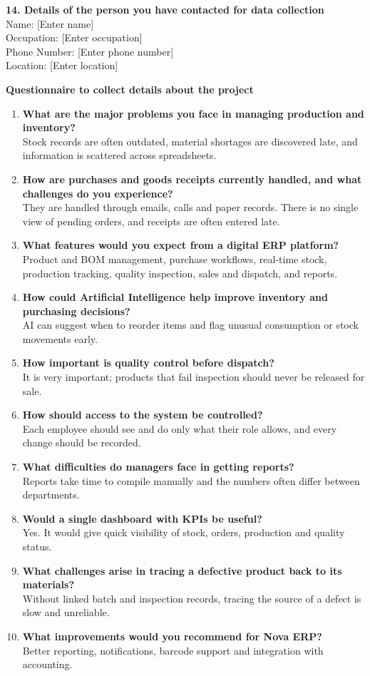 \documentclass[12pt,a4paper]{report}
\begin{document}
\textbf{14. Details of the person you have contacted for data collection}\\
Name: [Enter name]\\
Occupation: [Enter occupation]\\
Phone Number: [Enter phone number]\\
Location: [Enter location]

\textbf{Questionnaire to collect details about the project}
\begin{enumerate}
\item \textbf{What are the major problems you face in managing production and inventory?}\\
Stock records are often outdated, material shortages are discovered late, and information is scattered across spreadsheets.
\item \textbf{How are purchases and goods receipts currently handled, and what challenges do you experience?}\\
They are handled through emails, calls and paper records. There is no single view of pending orders, and receipts are often entered late.
\item \textbf{What features would you expect from a digital ERP platform?}\\
Product and BOM management, purchase workflows, real-time stock, production tracking, quality inspection, sales and dispatch, and reports.
\item \textbf{How could Artificial Intelligence help improve inventory and purchasing decisions?}\\
AI can suggest when to reorder items and flag unusual consumption or stock movements early.
\item \textbf{How important is quality control before dispatch?}\\
It is very important; products that fail inspection should never be released for sale.
\item \textbf{How should access to the system be controlled?}\\
Each employee should see and do only what their role allows, and every change should be recorded.
\item \textbf{What difficulties do managers face in getting reports?}\\
Reports take time to compile manually and the numbers often differ between departments.
\item \textbf{Would a single dashboard with KPIs be useful?}\\
Yes. It would give quick visibility of stock, orders, production and quality status.
\item \textbf{What challenges arise in tracing a defective product back to its materials?}\\
Without linked batch and inspection records, tracing the source of a defect is slow and unreliable.
\item \textbf{What improvements would you recommend for Nova ERP?}\\
Better reporting, notifications, barcode support and integration with accounting.
\end{enumerate}
\end{document}
